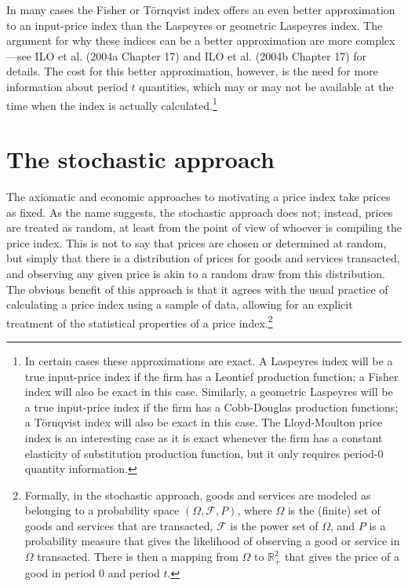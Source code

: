 \documentclass[]{article}
\begin{document}
In many cases the Fisher or Törnqvist index offers an even better approximation to an input-price index than the Laspeyres or geometric Laspeyres index. The argument for why these indices can be a better approximation are more complex---see ILO et al. (2004a Chapter 17) and ILO et al. (2004b Chapter 17) for details. The cost for this better approximation, however, is the need for more information about period \(t\) quantities, which may or may not be available at the time when the index is actually calculated.\footnote{In certain cases these approximations are exact. A Laspeyres index will be a true input-price index if the firm has a Leontief production function; a Fisher index will also be exact in this case. Similarly, a geometric Laspeyres will be a true input-price index if the firm has a Cobb-Douglas production functions; a Törnqvist index will also be exact in this case. The Lloyd-Moulton price index is an interesting case as it is exact whenever the firm has a constant elasticity of substitution production function, but it only requires period-0 quantity information.}

\hypertarget{the-stochastic-approach}{%
\section{The stochastic approach}\label{the-stochastic-approach}}

The axiomatic and economic approaches to motivating a price index take prices as fixed. As the name suggests, the stochastic approach does not; instead, prices are treated as random, at least from the point of view of whoever is compiling the price index. This is not to say that prices are chosen or determined at random, but simply that there is a distribution of prices for goods and services transacted, and observing any given price is akin to a random draw from this distribution. The obvious benefit of this approach is that it agrees with the usual practice of calculating a price index using a sample of data, allowing for an explicit treatment of the statistical properties of a price index.\footnote{Formally, in the stochastic approach, goods and services are modeled as belonging to a probability space \((\Omega, \mathcal{F}, P)\), where \(\Omega\) is the (finite) set of goods and services that are transacted, \(\mathcal{F}\) is the power set of \(\Omega\), and \(P\) is a probability measure that gives the likelihood of observing a good or service in \(\Omega\) transacted. There is then a mapping from \(\Omega\) to \(\mathbb{R}_{+}^{2}\) that gives the price of a good in period 0 and period \(t\).}
\end{document}
